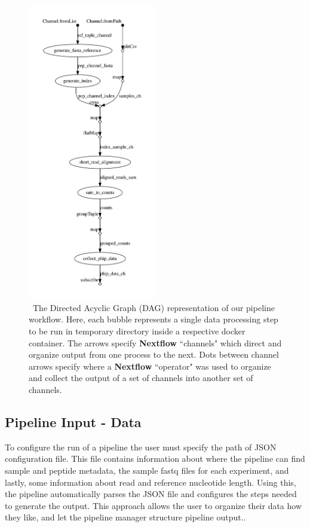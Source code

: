 \documentclass{article}
\begin{document}
\begin{figure}[h!!!!]
\centering
    \includegraphics[width=0.5\textwidth]{figures/dag-1.png}
    \caption { \
The Directed Acyclic Graph (DAG) representation of our pipeline workflow. 
Here, each bubble represents a single data processing step to be run in temporary directory inside a respective docker container. 
The arrows specify \textbf{Nextflow} ``channels" which direct and organize output from one process to the next. 
Dots between channel arrows specify where a \textbf{Nextflow} ``operator" was used to organize and collect the output of a set of channels into another set of channels.
}
\label{fig:DAG}
\end{figure}

\subsection*{Pipeline Input - Data}

To configure the run of a pipeline the user must specify the path of JSON configuration file.
This file contains information about where the pipeline can find sample and peptide metadata, 
the sample fastq files for each experiment, and lastly, some information about read and reference nucleotide length. 
Using this, the pipeline automatically parses the JSON file and configures the steps needed to generate the output.
This approach allows the user to organize their data how they like, and let the pipeline manager structure pipeline output..
\end{document}
